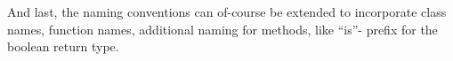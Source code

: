 And last, the naming conventions can of-course be extended to incorporate class names, function names, additional naming for methods,
like ``is''- prefix for the boolean return type. 







